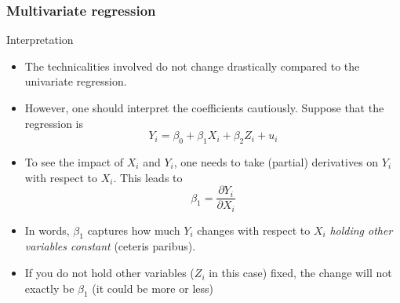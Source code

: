\documentclass[compress]{beamer}
\begin{document}
\begin{frame}
\frametitle{Multivariate regression}
Interpretation
\begin{itemize}
\item The technicalities involved do not change drastically compared to the univariate regression. 
\item However, one should interpret the coefficients cautiously. Suppose that the regression is
\[
Y_i = \beta_0 + \beta_1 X_i + \beta_2 Z_i+u_i
\]
\item To see the impact of $X_i$ and $Y_i$, one needs to take (partial) derivatives on $Y_i$ with respect to $X_i$. This leads to
\[
\beta_1 = \frac{\partial Y_i}{\partial X_i}
\]
\item In words, $\beta_1$ captures how much $Y_i$ changes with respect to $X_i$ \emph{holding other variables constant} (ceteris paribus).
\item If you do not hold other variables ($Z_i$ in this case) fixed, the change will not exactly be $\beta_1$ (it could be more or less)

\end{itemize}
\end{frame}
\end{document}
